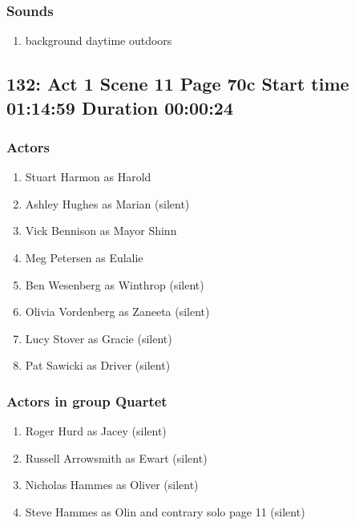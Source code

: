 \subsubsection{Sounds}
\begin{enumerate}
\item background daytime outdoors
\end{enumerate}
\subsection{132: Act 1 Scene 11 Page 70c Start time 01:14:59 Duration 00:00:24}

\subsubsection{Actors}
\begin{enumerate}
\item Stuart Harmon as Harold
\item Ashley Hughes as Marian (silent)
\item Vick Bennison as Mayor Shinn
\item Meg Petersen as Eulalie
\item Ben Wesenberg as Winthrop (silent)
\item Olivia Vordenberg as Zaneeta (silent)
\item Lucy Stover as Gracie (silent)
\item Pat Sawicki as Driver (silent)
\end{enumerate}
\subsubsection{Actors in group Quartet}
\begin{enumerate}
\item Roger Hurd as Jacey (silent)
\item Russell Arrowsmith as Ewart (silent)
\item Nicholas Hammes as Oliver (silent)
\item Steve Hammes as Olin and contrary solo page 11 (silent)
\end{enumerate}
